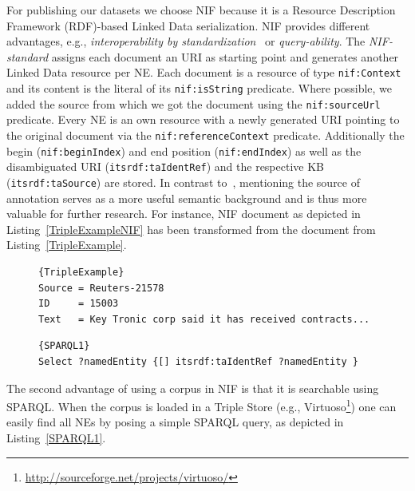 For publishing our datasets we choose NIF because it is a Resource Description Framework (RDF)-based Linked Data serialization.
NIF provides different advantages, e.g., \emph{interoperability by standardization}~\cite{ISWC2013NIF} or \emph{query-ability}.
The \emph{NIF-standard} assigns each document an URI as starting point and generates another Linked Data resource per NE.
Each document is a resource of type \texttt{nif:Context} and its content is the literal of its \texttt{nif:isString} predicate. 
Where possible, we added the source from which we got the document using the \texttt{nif:sourceUrl} predicate.
Every NE is an own resource with a newly generated URI pointing to the original document via the \texttt{nif:referenceContext} predicate.
Additionally the begin (\texttt{nif:beginIndex}) and end position (\texttt{nif:endIndex}) as well as the disambiguated URI (\texttt{itsrdf:taIdentRef}) and the respective KB (\texttt{itsrdf:taSource}) are stored.
In contrast to~\cite{NEDstatBench}, mentioning the source of annotation serves as a more useful semantic background and is thus more valuable for further research.
For instance, NIF document as depicted in Listing~\ref{TripleExampleNIF} has been transformed from the document from Listing~\ref{TripleExample}.

\begin{figure}[tb]
\begin{lstlisting}[label=TripleExample,caption=example input text.]{TripleExample}
Source = Reuters-21578
ID     = 15003
Text   = Key Tronic corp said it has received contracts...
\end{lstlisting}
\end{figure}

\begin{figure}[tb]
\begin{lstlisting}[label=SPARQL1,caption=SPARQL query to get all NEs.]{SPARQL1}
Select ?namedEntity {[] itsrdf:taIdentRef ?namedEntity }
\end{lstlisting}
\end{figure}


The second advantage of using a corpus in NIF is that it is searchable using SPARQL.
When the corpus is loaded in a Triple Store (e.g., Virtuoso\footnote{\url{http://sourceforge.net/projects/virtuoso/}}) one can easily find all NEs by posing a simple SPARQL query, as depicted in Listing~\ref{SPARQL1}.

